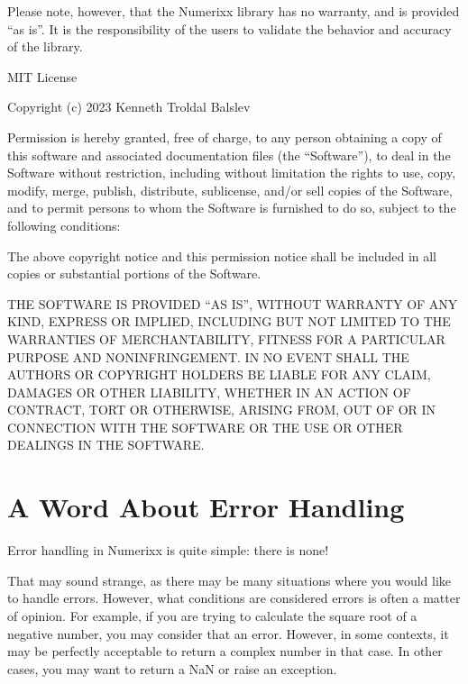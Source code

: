 \documentclass[letterpaper,10pt,english]{sphinxmanual}
\begin{document}
\sphinxAtStartPar
Please note, however, that the Numerixx library has no warranty, and is provided “as is”. It is the responsibility of the users to validate the behavior and accuracy of the library.

\sphinxAtStartPar
MIT License

\sphinxAtStartPar
Copyright (c) 2023 Kenneth Troldal Balslev

\sphinxAtStartPar
Permission is hereby granted, free of charge, to any person obtaining a copy
of this software and associated documentation files (the “Software”), to deal
in the Software without restriction, including without limitation the rights
to use, copy, modify, merge, publish, distribute, sublicense, and/or sell
copies of the Software, and to permit persons to whom the Software is
furnished to do so, subject to the following conditions:

\sphinxAtStartPar
The above copyright notice and this permission notice shall be included in all
copies or substantial portions of the Software.

\sphinxAtStartPar
THE SOFTWARE IS PROVIDED “AS IS”, WITHOUT WARRANTY OF ANY KIND, EXPRESS OR
IMPLIED, INCLUDING BUT NOT LIMITED TO THE WARRANTIES OF MERCHANTABILITY,
FITNESS FOR A PARTICULAR PURPOSE AND NONINFRINGEMENT. IN NO EVENT SHALL THE
AUTHORS OR COPYRIGHT HOLDERS BE LIABLE FOR ANY CLAIM, DAMAGES OR OTHER
LIABILITY, WHETHER IN AN ACTION OF CONTRACT, TORT OR OTHERWISE, ARISING FROM,
OUT OF OR IN CONNECTION WITH THE SOFTWARE OR THE USE OR OTHER DEALINGS IN THE
SOFTWARE.

\sphinxstepscope


\chapter{A Word About Error Handling}
\label{\detokenize{docError:a-word-about-error-handling}}\label{\detokenize{docError:error-handling}}\label{\detokenize{docError::doc}}
\sphinxAtStartPar
Error handling in Numerixx is quite simple: there is none!

\sphinxAtStartPar
That may sound strange, as there may be many situations where you would like to handle errors. However, what conditions are considered errors is often a matter of opinion. For example, if you are trying to calculate the square root of a negative number, you may consider that an error. However, in some contexts, it may be perfectly acceptable to return a complex number in that case. In other cases, you may want to return a NaN or raise an exception.
\end{document}
